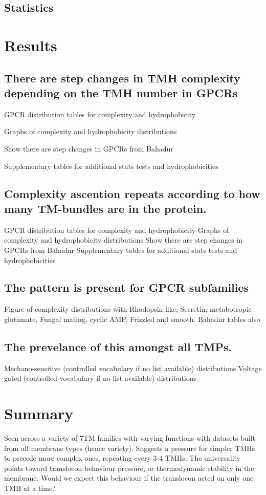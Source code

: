 \subsection{Statistics}

\section{Results}
\subsection{There are step changes in TMH complexity depending on the TMH number in GPCRs}
GPCR distribution tables for complexity and hydrophobicity

Graphs of complexity and hydrophobicity distributions

Show there are step changes in GPCRs from Bahadur

Supplementary tables for additional stats tests and hydrophobicities

\subsection{Complexity ascention repeats according to how many TM-bundles are in the protein.}
GPCR distribution tables for complexity and hydrophobicity
Graphs of complexity and hydrophobicity distributions
Show there are step changes in GPCRs from Bahadur
Supplementary tables for additional stats tests and hydrophobicities

\subsection{The pattern is present for GPCR subfamilies}
Figure of complexity distributions with Rhodopsin like, Secretin, metabotropic glutamate, Fungal mating, cyclic AMP, Frizzled and smooth.
Bahadur tables also

\subsection{The prevelance of this amongst all TMPs.}
Mechano-sensitive (controlled vocabulary if no list available) distributions
Voltage gated (controlled vocabulary if no list available) distributions

\section{Summary}


Seen across a variety of 7TM families with varying functions with datasets built from all membrane types (hence variety).
Suggests a pressure for simpler TMHs to precede more complex ones, repeating every 3-4 TMHs.
The universality points toward translocon behaviour pressure, or thermodynamic stability in the membrane.
Would we expect this behaviour if the translocon acted on only one TMH at a time?
